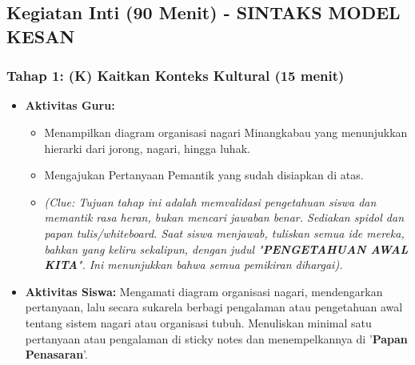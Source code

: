 \documentclass[a4paper,12pt]{article}
\begin{document}
\subsection{Kegiatan Inti (90 Menit) - SINTAKS MODEL KESAN}

\subsubsection{Tahap 1: (K) Kaitkan Konteks Kultural (15 menit)}
\begin{itemize}
\item \textbf{Aktivitas Guru:}
    \begin{itemize}
    \item Menampilkan diagram organisasi nagari Minangkabau yang menunjukkan hierarki dari jorong, nagari, hingga luhak.
    \item Mengajukan Pertanyaan Pemantik yang sudah disiapkan di atas.
    \item \textit{(Clue: Tujuan tahap ini adalah memvalidasi pengetahuan siswa dan memantik rasa heran, bukan mencari jawaban benar. Sediakan spidol dan papan tulis/whiteboard. Saat siswa menjawab, tuliskan semua ide mereka, bahkan yang keliru sekalipun, dengan judul "\textbf{PENGETAHUAN AWAL KITA}". Ini menunjukkan bahwa semua pemikiran dihargai).}
    \end{itemize}
\item \textbf{Aktivitas Siswa:} Mengamati diagram organisasi nagari, mendengarkan pertanyaan, lalu secara sukarela berbagi pengalaman atau pengetahuan awal tentang sistem nagari atau organisasi tubuh. Menuliskan minimal satu pertanyaan atau pengalaman di sticky notes dan menempelkannya di '\textbf{Papan Penasaran}'.
\end{itemize}
\end{document}
